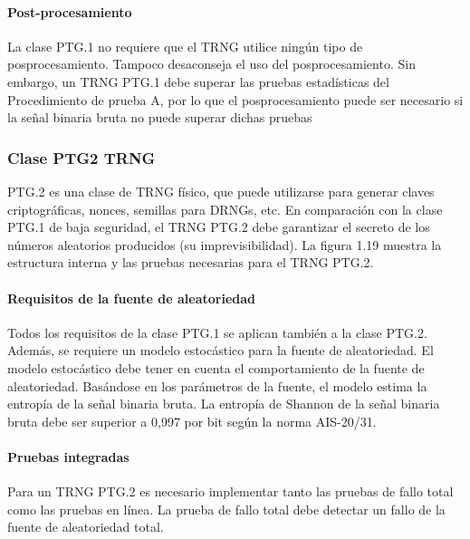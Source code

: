 		\paragraph{Post-procesamiento\\}
		
		La clase PTG.1 no requiere que el TRNG utilice ningún tipo de posprocesamiento. Tampoco desaconseja el uso del posprocesamiento. Sin embargo, un TRNG PTG.1 debe superar las pruebas estadísticas del Procedimiento de prueba A, por lo que el posprocesamiento puede ser necesario si la señal binaria bruta no puede superar dichas pruebas
		
	\subsubsection{Clase PTG2 TRNG}
	
		PTG.2 es una clase de TRNG físico, que puede utilizarse para generar claves criptográficas, nonces, semillas para DRNGs, etc. En comparación con la clase PTG.1 de baja seguridad, el TRNG PTG.2 debe garantizar el secreto de los números aleatorios producidos (su imprevisibilidad). La figura 1.19 muestra la estructura interna y las pruebas necesarias para el TRNG PTG.2.
	
		\paragraph{Requisitos de la fuente de aleatoriedad\\}
		
			Todos los requisitos de la clase PTG.1 se aplican también a la clase PTG.2. Además, se requiere un modelo estocástico para la fuente de aleatoriedad. El modelo estocástico debe tener en cuenta el comportamiento de la fuente de aleatoriedad. Basándose en los parámetros de la fuente, el modelo estima la entropía de la señal binaria bruta. La entropía de Shannon de la señal binaria bruta debe ser superior a 0,997 por bit según la norma AIS-20/31.
		
		
		\paragraph{Pruebas integradas\\}
		
			Para un TRNG PTG.2 es necesario implementar tanto las pruebas de fallo total como las pruebas en línea. La prueba de fallo total debe detectar un fallo de la fuente de aleatoriedad total.

